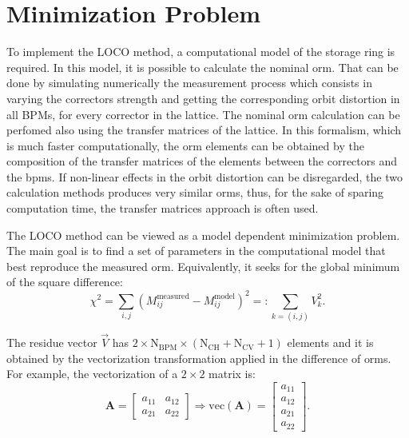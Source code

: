 
\section{Minimization Problem}
To implement the LOCO method, a computational model of the storage ring is required. In this model, it is possible to calculate the nominal \gls{orm}. That can be done by simulating numerically the measurement process which consists in varying the correctors strength and getting the corresponding orbit distortion in all BPMs, for every corrector in the lattice. The nominal \gls{orm} calculation can be perfomed also using the transfer matrices of the lattice. In this formalism, which is much faster computationally, the \gls{orm} elements can be obtained by the composition of the transfer matrices of the elements between the correctors and the \gls{bpm}s. If non-linear effects in the orbit distortion can be disregarded, the two calculation methods produces very similar \gls{orm}s, thus, for the sake of sparing computation time, the transfer matrices approach is often used.

The LOCO method can be viewed as a model dependent minimization problem. The main goal is to find a set of parameters in the computational model that best reproduce the measured \gls{orm}. Equivalently, it seeks for the global minimum of the square difference:
\begin{equation}
    \chi^2 = \sum_{i, j} \left(M^{\mathrm{measured}}_{ij} - M^{\mathrm{model}}_{ij}\right)^2 =: \sum_{{k = (i,j)}} V_{k}^2.
    \label{eq:chi2}
\end{equation}

The residue vector $\vec{V}$ has $2 \times \mathrm{N}_{\mathrm{BPM}} \times \left(\mathrm{N}_{\mathrm{CH}} + \mathrm{N}_{\mathrm{CV}}+1\right)$ elements and it is obtained by the vectorization transformation applied in the difference of \gls{orm}s. For example, the vectorization of a $2 \times 2$ matrix is:
\begin{equation}
        \mathbf{A} = \begin{bmatrix}
     a_{11} & a_{12} \\
     a_{21} & a_{22} 
\end{bmatrix} \Rightarrow \mathrm{vec}\left(\mathbf{A}\right) = \begin{bmatrix}
     a_{11}  \\
     a_{12} \\
     a_{21} \\ 
     a_{22} 
\end{bmatrix}.
\end{equation}

